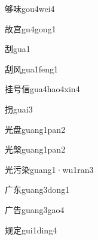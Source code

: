 \begin{verbete}[11;8]{够味}{gou4wei4}
\end{verbete}

\begin{verbete*}[9;9]{故宫}{gu4gong1}
\end{verbete*}

\begin{verbete}[8]{刮}{gua1}
\end{verbete}

\begin{verbete}[8;4]{刮风}{gua1feng1}
\end{verbete}

\begin{verbete}[9;5;9]{挂号信}{gua4hao4xin4}
\end{verbete}

\begin{verbete}[8]{拐}{guai3}
\end{verbete}

\begin{verbete}[6;11]{光盘}{guang1pan2}
\end{verbete}

\begin{verbete}[6;14]{光槃}{guang1pan2}
\end{verbete}

\begin{verbete}[6;6;9]{光污染}{guang1·wu1ran3}
\end{verbete}

\begin{verbete*}[3;5]{广东}{guang3dong1}
\end{verbete*}

\begin{verbete}[3;7]{广告}{guang3gao4}
\end{verbete}

\begin{verbete}[8;8]{规定}{gui1ding4}
\end{verbete}

